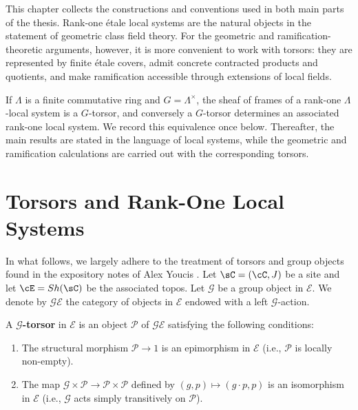 This chapter collects the constructions and conventions used in both main parts of
the thesis. Rank-one \'etale local systems are the natural objects in the statement
of geometric class field theory. For the geometric and ramification-theoretic
arguments, however, it is more convenient to work with torsors: they are represented
by finite \'etale covers, admit concrete contracted products and quotients, and make
ramification accessible through extensions of local fields. 

If \(\Lambda\) is a finite commutative ring and \(G=\Lambda^\times\), the sheaf of
frames of a rank-one \(\Lambda\)-local system is a \(G\)-torsor, and conversely a
\(G\)-torsor determines an associated rank-one local system. 
We record this equivalence once below. Thereafter, the main results are stated in
the language of local systems, while the geometric and ramification calculations
are carried out with the corresponding torsors.

\section{Torsors and Rank-One Local Systems}

In what follows, we largely adhere to the treatment of torsors and group objects found in the expository notes of Alex Youcis \cite{YoucisTorsors}.
Let $\sC=(\cC, J)$ be a site and let $\cE=Sh(\sC)$ be the associated topos. 
Let $\mathcal{G}$ be a group object in $\mathcal{E}$. 
We denote by $\mathcal{G}\mathcal{E}$ the category of objects in $\mathcal{E}$ endowed with a left $\mathcal{G}$-action. 

\begin{definition}
    A \textbf{$\mathcal{G}$-torsor} in $\mathcal{E}$ is an object $\mathcal{P}$ of $\mathcal{G}\mathcal{E}$ satisfying the following conditions:
    \begin{enumerate}
        \item The structural morphism $\mathcal{P} \to 1$ is an epimorphism in $\mathcal{E}$ (i.e., $\mathcal{P}$ is locally non-empty).
        \item The map $\mathcal{G} \times \mathcal{P} \to \mathcal{P} \times \mathcal{P}$ defined by $(g, p) \mapsto (g \cdot p, p)$ is an isomorphism in $\mathcal{E}$ (i.e., $\mathcal{G}$ acts simply transitively on $\mathcal{P}$).
    \end{enumerate}
\end{definition}

